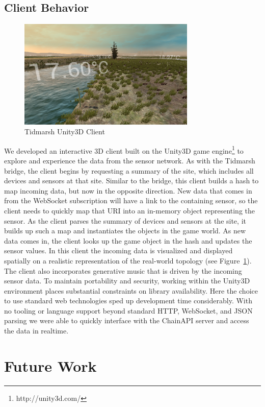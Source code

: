 \documentclass{acm_proc_article-sp}
\begin{document}
\subsection{Client Behavior}

\begin{figure}
    \centering
    \includegraphics[width=8.45cm]{tidmarsh_screenshot}
    \caption{Tidmarsh Unity3D Client}
    \label{tidmarsh_screenshot}
\end{figure}

We developed an interactive 3D client built on the Unity3D game
engine\footnote{http://unity3d.com/} to explore and experience the data from
the sensor network. As with the Tidmarsh bridge, the client begins by
requesting a summary of the site, which includes all devices and sensors at
that site. Similar to the bridge, this client builds a hash to map incoming
data, but now in the opposite direction. New data that comes in from the
WebSocket subscription will have a link to the containing sensor, so the client
needs to quickly map that URI into an in-memory object representing the sensor.
As the client parses the summary of devices and sensors at the site, it builds
up such a map and instantiates the objects in the game world. As new data comes
in, the client looks up the game object in the hash and updates the sensor
values. In this client the incoming data is visualized and displayed spatially
on a realistic representation of the real-world topology (see
Figure~\ref{tidmarsh_screenshot}). The client also incorporates generative
music that is driven by the incoming sensor data. To maintain portability and
security, working within the Unity3D environment places substantial constraints
on library availability. Here the choice to use standard web technologies sped
up development time considerably. With no tooling or language support beyond
standard HTTP, WebSocket, and JSON parsing we were able to quickly interface
with the ChainAPI server and access the data in realtime.

\section{Future Work}
\end{document}
